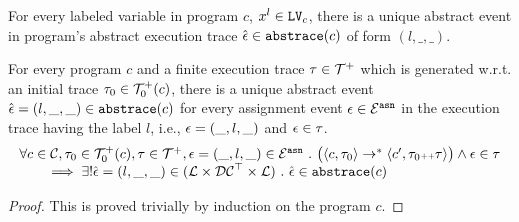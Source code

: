   For every labeled variable in program $c$, $x^l \in \mathtt{LV}_c$, there is a unique abstract event in program's abstract execution trace $\hat{\mathtt{\epsilon}{}} \in \mathtt{abs}{\mathtt{trace}}(c)$ of form $(l, \_, \_)$. 
  \begin{lemma}
  For every program $c$ and
  a finite execution trace $\mathtt{\tau} \in \mathcal{T}^{+}$ which is generated w.r.t.
  an initial trace $\mathtt{\tau}_0 \in \mathcal{T}^{+}_0(c)$,
  there is a unique abstract event $\hat{\mathtt{\epsilon}{}} = (l, \_, \_) \in \mathtt{abs}{\mathtt{trace}}(c)$ 
  for every assignment event $\mathtt{\epsilon} \in \mathcal{E}^{\mathtt{{asn}}}$ in the
  execution trace having the label $l$, i.e., $\mathtt{\epsilon} = (\_, l, \_)$ and $\mathtt{\epsilon} \in \mathtt{\tau}$.
  \[
    \begin{array}{l}
    \forall c \in \mathcal{C}, \mathtt{\tau}_0 \in \mathcal{T}^{+}_0(c), \mathtt{\tau} \in \mathcal{T}^{+} ,  \mathtt{\epsilon} = (\_, l, \_) \in \mathcal{E}^{\mathtt{{asn}}} ~.~
    \big(
      \langle {c}, \mathtt{\tau}_0 \rangle \to^{*} \langle c', \mathtt{\tau}_0 {\scriptscriptstyle ++} \mathtt{\tau} \rangle 
    \big)
    \land \mathtt{\epsilon} \in \mathtt{\tau} 
    \\
    \qquad \implies \exists ! \hat{\mathtt{\epsilon}{}} = (l, \_, \_) \in (\mathcal{L}\times \mathcal{DC}^{\top} \times \mathcal{L}) ~.~ 
    \hat{\mathtt{\epsilon}{}} \in \mathtt{abs}{\mathtt{trace}}(c)
    \end{array}
  \]
  \end{lemma}
  \begin{proof}
    This is proved trivially by induction on the program $c$.
  \end{proof}